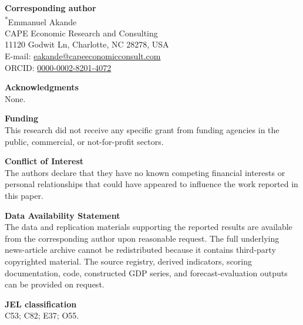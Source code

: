 \documentclass[11pt]{article}
\begin{document}
\textbf{Corresponding author}\\
\textsuperscript{*}Emmanuel Akande\\
CAPE Economic Research and Consulting\\
11120 Godwit Ln, Charlotte, NC 28278, USA\\
E-mail: \href{mailto:eakande@capeeconomicconsult.com}{eakande@capeeconomicconsult.com}\\
ORCID: \href{https://orcid.org/0000-0002-8201-4072}{0000-0002-8201-4072}

\textbf{Acknowledgments}\\
None.

\textbf{Funding}\\
This research did not receive any specific grant from funding agencies in the public, commercial, or not-for-profit sectors.

\textbf{Conflict of Interest}\\
The authors declare that they have no known competing financial interests or personal relationships that could have appeared to influence the work reported in this paper.

\textbf{Data Availability Statement}\\
The data and replication materials supporting the reported results are available from the corresponding author upon reasonable request. The full underlying news-article archive cannot be redistributed because it contains third-party copyrighted material. The source registry, derived indicators, scoring documentation, code, constructed GDP series, and forecast-evaluation outputs can be provided on request.

\textbf{JEL classification}\\
C53; C82; E37; O55.
\end{document}
